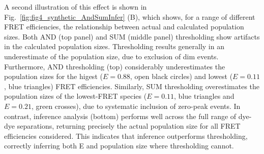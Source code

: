 A second illustration of this effect is shown in Fig.~\ref{fig:fig4_synthetic_AndSumInfer} (B), which shows, for a range of different FRET efficiencies, the relationship between actual and calculated population sizes. Both AND (top panel) and SUM (middle panel) thresholding show artifacts in the calculated population sizes. Thresholding results generally in an underestimate of the population size, due to exclusion of dim events. Furthermore, AND thresholding (top) considerably underestimates the population sizes for the higest ($E=0.88$, open black circles) and lowest ($E = 0.11$, blue triangles) FRET efficiencies. Similarly, SUM thresholding overestimates the population sizes of the lowest-FRET species ($E = 0.11$, blue triangles and $E = 0.21$, green crosses), due to systematic inclusion of zero-peak events.   In contrast, inference analysis (bottom) performs well across the full range of dye-dye separations, returning precisely the actual population size for all FRET efficiencies considered. This indicates that inference outperforms thresholding, correctly inferring both E and population size where thresholding cannot. 

